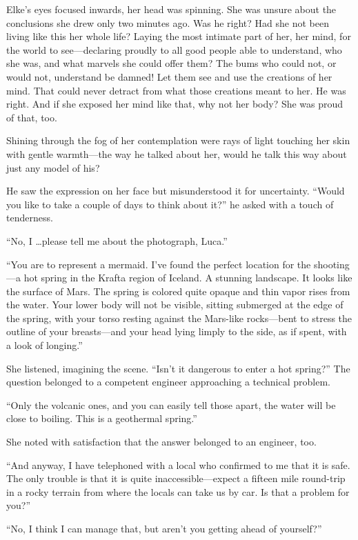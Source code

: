 Elke's eyes focused inwards, her head was spinning. She was unsure about the conclusions she drew only two minutes ago. Was he right? Had she not been living like this her whole life? Laying the most intimate part of her, her mind, for the world to see---declaring proudly to all good people able to understand, who she was, and what marvels she could offer them? The bums who could not, or would not, understand be damned! Let them see and use the creations of her mind. That could never detract from what those creations meant to her. He was right. And if she exposed her mind like that, why not her body? She was proud of that, too.

Shining through the fog of her contemplation were rays of light touching her skin with gentle warmth---the way he talked about her, would he talk this way about just any model of his?

He saw the expression on her face but misunderstood it for uncertainty. ``Would you like to take a couple of days to think about it?'' he asked with a touch of tenderness.

``No, I \ldots please tell me about the photograph, Luca.''

``You are to represent a mermaid. I've found the perfect location for the shooting---a hot spring in the Krafta region of Iceland. A stunning landscape. It looks like the surface of Mars. The spring is colored quite opaque and thin vapor rises from the water. Your lower body will not be visible, sitting submerged at the edge of the spring, with your torso resting against the Mars-like rocks---bent to stress the outline of your breasts---and your head lying limply to the side, as if spent, with a look of longing.''

She listened, imagining the scene. ``Isn't it dangerous to enter a hot spring?'' The question belonged to a competent engineer approaching a technical problem.

``Only the volcanic ones, and you can easily tell those apart, the water will be close to boiling. This is a geothermal spring.''

She noted with satisfaction that the answer belonged to an engineer, too.

``And anyway, I have telephoned with a local who confirmed to me that it is safe. The only trouble is that it is quite inaccessible---expect a fifteen mile round-trip in a rocky terrain from where the locals can take us by car. Is that a problem for you?''

``No, I think I can manage that, but aren't you getting ahead of yourself?''

